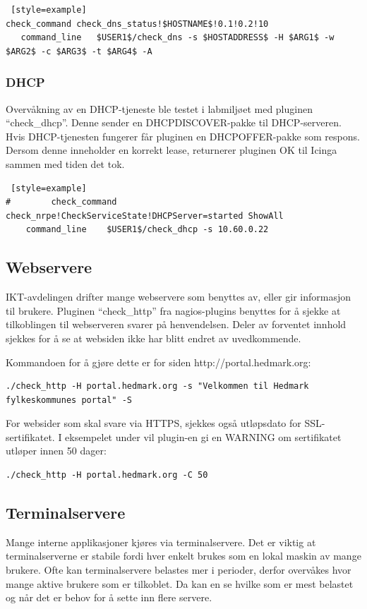 \begin{lstlisting} [style=example]
check_command check_dns_status!$HOSTNAME$!0.1!0.2!10
   command_line   $USER1$/check_dns -s $HOSTADDRESS$ -H $ARG1$ -w $ARG2$ -c $ARG3$ -t $ARG4$ -A
\end{lstlisting}

\subsubsection*{DHCP}
Overvåkning av en DHCP-tjeneste ble testet i labmiljøet med pluginen ``check\_dhcp''. Denne sender en DHCPDISCOVER-pakke til DHCP-serveren. Hvis DHCP-tjenesten fungerer får pluginen en DHCPOFFER-pakke som respons. Dersom denne inneholder en korrekt lease, returnerer pluginen OK til Icinga sammen med tiden det tok.

\begin{lstlisting} [style=example]
#        check_command           check_nrpe!CheckServiceState!DHCPServer=started ShowAll
    command_line    $USER1$/check_dhcp -s 10.60.0.22
\end{lstlisting}

\subsection{Webservere}\label{sec:webservere}
IKT-avdelingen drifter mange webservere som benyttes av, eller gir informasjon til brukere. Pluginen ``check\_http'' \cite{checkhttp} fra nagios-plugins benyttes for å sjekke at tilkoblingen til webserveren svarer på henvendelsen. Deler av forventet innhold sjekkes for å se at websiden ikke har blitt endret av uvedkommende.

Kommandoen for å gjøre dette er for siden http://portal.hedmark.org:
\begin{lstlisting}[style=example]
./check_http -H portal.hedmark.org -s "Velkommen til Hedmark fylkeskommunes portal" -S 
\end{lstlisting}

For websider som skal svare via HTTPS, sjekkes også utløpsdato for SSL-sertifikatet. I eksempelet under vil plugin-en gi en WARNING om sertifikatet utløper innen 50 dager:
\begin{lstlisting}[style=example]
./check_http -H portal.hedmark.org -C 50
\end{lstlisting}

\subsection{Terminalservere}\label{sec:terminalservere}
Mange interne applikasjoner kjøres via terminalservere. Det er viktig at terminalserverne er stabile fordi hver enkelt brukes som en lokal maskin av mange brukere. Ofte kan terminalservere belastes mer i perioder, derfor overvåkes hvor mange aktive brukere som er tilkoblet. Da kan en se hvilke som er mest belastet og når det er behov for å sette inn flere servere.

